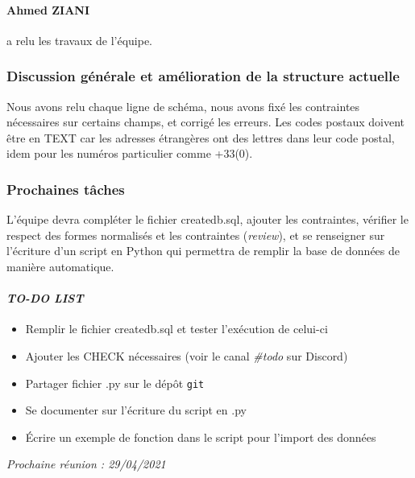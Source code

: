 \paragraph{Ahmed ZIANI} a relu les travaux de l'équipe.

\subsubsection*{Discussion générale et amélioration de la structure actuelle}
Nous avons relu chaque ligne de schéma, nous avons fixé les contraintes nécessaires sur certains champs, et corrigé les erreurs. Les codes postaux doivent être en \textsf{TEXT} car les adresses étrangères ont des lettres dans leur code postal, idem pour les numéros particulier comme \textsf{+33(0)}.

\subsubsection*{Prochaines tâches}
L'équipe devra compléter le fichier \textsf{createdb.sql}, ajouter les contraintes, vérifier le respect des formes normalisés et les contraintes (\textsl{review}), et se renseigner sur l'écriture d'un script en \textsf{Python} qui permettra de remplir la base de données de manière automatique.


\paragraph{\emph{TO-DO LIST}}
\begin{itemize}
    \item Remplir le fichier \textsf{createdb.sql} et tester l'exécution de celui-ci
    \item Ajouter les \textsf{CHECK} nécessaires (voir le canal \textsl{\#todo} sur Discord)
    \item Partager fichier \textsf{.py} sur le dépôt \texttt{git}
    \item Se documenter sur l'écriture du script en \textsf{.py}
    \item Écrire un exemple de fonction dans le script pour l'import des données
    
\end{itemize}

\emph{Prochaine réunion : 29/04/2021}\\

% 